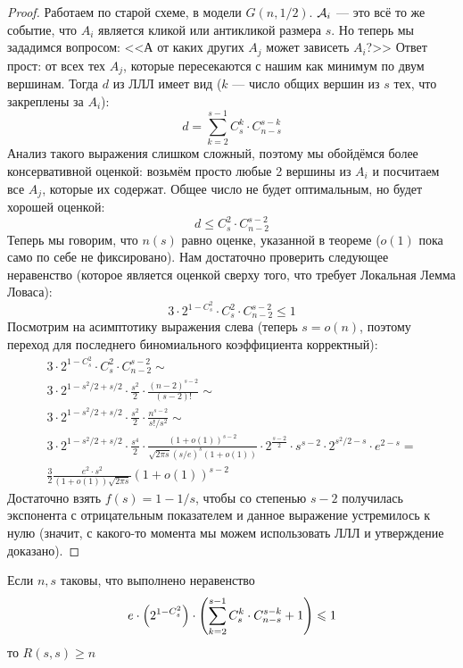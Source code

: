 \begin{proof}
	Работаем по старой схеме, в модели $G(n, 1 / 2)$. $\mathcal{A}_i$ --- это всё то же событие, что $A_i$ является кликой или антикликой размера $s$. Но теперь мы зададимся вопросом: <<А от каких других $A_j$ может зависеть $A_i$?>> Ответ прост: от всех тех $A_j$, которые пересекаются с нашим как минимум по двум вершинам. Тогда $d$ из ЛЛЛ имеет вид ($k$ --- число общих вершин из $s$ тех, что закреплены за $A_i$):
	\[
		d = \sum_{k = 2}^{s - 1} C_s^k \cdot C_{n - s}^{s - k}
	\]
	Анализ такого выражения слишком сложный, поэтому мы обойдёмся более консервативной оценкой: возьмём просто любые 2 вершины из $A_i$ и посчитаем все $A_j$, которые их содержат. Общее число не будет оптимальным, но будет хорошей оценкой:
	\[
		d \le C_s^2 \cdot C_{n - 2}^{s - 2}
	\]
	Теперь мы говорим, что $n(s)$ равно оценке, указанной в теореме ($o(1)$ пока само по себе не фиксировано). Нам достаточно проверить следующее неравенство (которое является оценкой сверху того, что требует Локальная Лемма Ловаса):
	\[
		3 \cdot 2^{1 - C_s^2} \cdot C_s^2 \cdot C_{n - 2}^{s - 2} \le 1
	\]
	Посмотрим на асимптотику выражения слева (теперь $s = o(n)$, поэтому переход для последнего биномиального коэффициента корректный):
	\begin{multline*}
		3 \cdot 2^{1 - C_s^2} \cdot C_s^2 \cdot C_{n - 2}^{s - 2} \sim
		\\
		3 \cdot 2^{1 - s^2 / 2 + s / 2} \cdot \frac{s^2}{2} \cdot \frac{(n - 2)^{s - 2}}{(s - 2)!} \sim
		\\
		3 \cdot 2^{1 - s^2 / 2 + s / 2} \cdot \frac{s^2}{2} \cdot \frac{n^{s - 2}}{s! / s^2} \sim
		\\
		3 \cdot 2^{1 - s^2 / 2 + s / 2} \cdot \frac{s^4}{2} \cdot \frac{(1 + o(1))^{s - 2}}{\sqrt{2\pi s} (s / e)^s (1 + o(1))} \cdot 2^{\frac{s - 2}{2}} \cdot s^{s - 2} \cdot 2^{s^2 / 2 - s} \cdot e^{2 - s} =
		\\
		\frac{3}{2} \frac{e^2 \cdot s^2}{(1 + o(1))\sqrt{2\pi s}} (1 + o(1))^{s - 2}
	\end{multline*}
	Достаточно взять $f(s) = 1 - 1 / s$, чтобы со степенью $s - 2$ получилась экспонента с отрицательным показателем и данное выражение устремилось к нулю (значит, с какого-то момента мы можем использовать ЛЛЛ и утверждение доказано).
\end{proof}

\begin{corollary}
	Если $n, s$ таковы, что выполнено неравенство
	\[
		e \cdot \left(2^{1 - C_s^2}\right) \cdot \left(\sum_{k = 2}^{s - 1} C_s^k \cdot C_{n - s}^{s - k} + 1\right) \leqslant 1
	\]
	то $R(s, s) \ge n$
\end{corollary}

